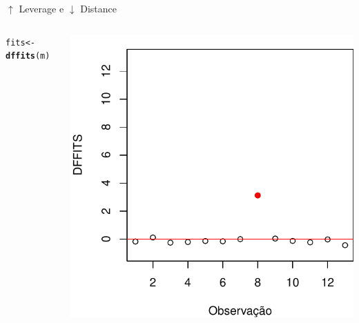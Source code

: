\documentclass{beamer}\usepackage[]{graphicx}\usepackage[]{color}
\makeatletter
\newcommand{\hlstd}[1]{\textcolor[rgb]{0.345,0.345,0.345}{#1}}%
\newcommand{\hlkwb}[1]{\textcolor[rgb]{0.69,0.353,0.396}{#1}}%
\newcommand{\hlkwd}[1]{\textcolor[rgb]{0.737,0.353,0.396}{\textbf{#1}}}%
\newenvironment{kframe}{%
 \def\at@end@of@kframe{}%
 \ifinner\ifhmode%
  \def\at@end@of@kframe{\end{minipage}}%
  \begin{minipage}{\columnwidth}%
 \fi\fi%
 \def\FrameCommand##1{\hskip\@totalleftmargin \hskip-\fboxsep
 \colorbox{shadecolor}{##1}\hskip-\fboxsep
     \hskip-\linewidth \hskip-\@totalleftmargin \hskip\columnwidth}%
 \MakeFramed {\advance\hsize-\width
   \@totalleftmargin\z@ \linewidth\hsize
   \@setminipage}}%
 {\par\unskip\endMakeFramed%
 \at@end@of@kframe}
\newenvironment{knitrout}{}{} %
\renewenvironment{knitrout}{\setlength{\topsep}{0mm}}{}
\makeatother
\begin{document}
\begin{frame}{$\uparrow$ Leverage e $\downarrow$ Distance}
\begin{columns}[c]
\begin{knitrout}\tiny
{}\color{fgcolor}\begin{kframe}
\begin{alltt}
\hlstd{fits} \hlkwb{<-} \hlkwd{dffits}\hlstd{(m)}
\end{alltt}
\end{kframe}
\includegraphics[width=1\linewidth]{figure/inf103-1} 

\end{knitrout}

\end{columns}
\end{frame}
\end{document}
